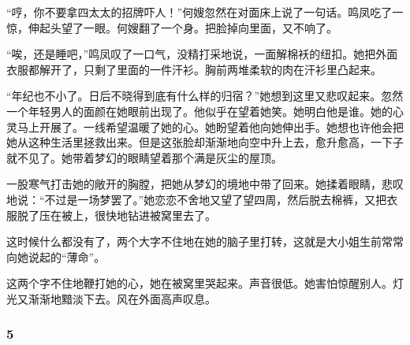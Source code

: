 \par “哼，你不要拿四太太的招牌吓人！”何嫂忽然在对面床上说了一句话。鸣凤吃了一惊，伸起头望了一眼。何嫂翻了一个身。把脸掉向里面，又不响了。
\par “唉，还是睡吧，”鸣凤叹了一口气，没精打采地说，一面解棉袄的纽扣。她把外面衣服都解开了，只剩了里面的一件汗衫。胸前两堆柔软的肉在汗衫里凸起来。
\par “年纪也不小了。日后不晓得到底有什么样的归宿？”她想到这里又悲叹起来。忽然一个年轻男人的面颜在她眼前出现了。他似乎在望着她笑。她明白他是谁。她的心灵马上开展了。一线希望温暖了她的心。她盼望着他向她伸出手。她想也许他会把她从这种生活里拯救出来。但是这张脸却渐渐地向空中升上去，愈升愈高，一下子就不见了。她带着梦幻的眼睛望着那个满是灰尘的屋顶。
\par 一股寒气打击她的敞开的胸膛，把她从梦幻的境地中带了回来。她揉着眼睛，悲叹地说：“不过是一场梦罢了。”她恋恋不舍地又望了望四周，然后脱去棉裤，又把衣服脱了压在被上，很快地钻进被窝里去了。
\par 这时候什么都没有了，两个大字不住地在她的脑子里打转，这就是大小姐生前常常向她说起的“薄命”。
\par 这两个字不住地鞭打她的心，她在被窝里哭起来。声音很低。她害怕惊醒别人。灯光又渐渐地黯淡下去。风在外面高声叹息。



\subsubsection*{5}


